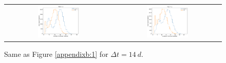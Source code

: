\documentclass[preprintm,linenumbers]{aastex631}
\begin{document}
\begin{figure}
\begin{tabular}{c c}
				 \includegraphics[width=0.4\textwidth]{results/histograms/hist_first_year_one_snap_v4_0_10yrs_db_noDD_noTwi_CountMetric_doAllTemplateMetrics_reduceCount_z_14_noDD_noTwi.pdf} &
				\includegraphics[width=0.4\textwidth]{results/histograms/hist_first_year_one_snap_v4_0_10yrs_db_noDD_noTwi_CountMetric_doAllTemplateMetrics_reduceCount_y_14_noDD_noTwi.pdf} \\
    			
			\end{tabular}
			\caption{ Same as Figure \ref{appendixb:1} for $\Delta t = 14\ \si{d}$. \label{appendixb:3}}
		\end{figure}
\end{document}
